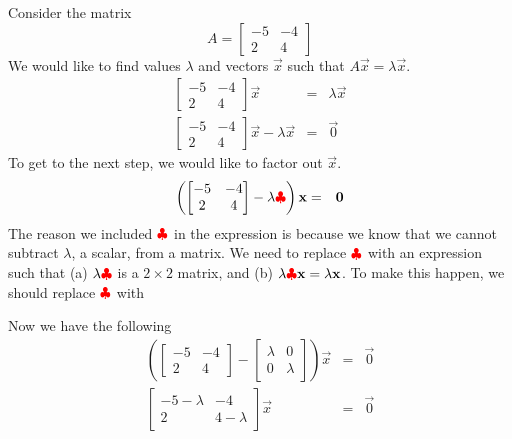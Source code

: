 \documentclass{ximera}
\begin{document}
\begin{exploration}\label{exp:eigenvaluesFind}
Consider the matrix
$$A=\begin{bmatrix}-5& -4\\2&4\end{bmatrix}$$
We would like to find values $\lambda$ and vectors $\vec{x}$ such that $A\vec{x}=\lambda\vec{x}$.
\begin{eqnarray*}
\begin{bmatrix}-5& -4\\2&4\end{bmatrix}\vec{x} &=& \lambda\vec{x}\\
\begin{bmatrix}-5& -4\\2&4\end{bmatrix}\vec{x} - \lambda\vec{x}&=&\vec{0}
\end{eqnarray*}
To get to the next step, we would like to factor out $\vec{x}$.  
\begin{eqnarray*}
    \left(\begin{bmatrix}-5& -4\\2&4\end{bmatrix} - \lambda {\color{red}\clubsuit}\right)\vec{x}&=&\vec{0}
\end{eqnarray*}
The reason we included ${\color{red}\clubsuit}$ in the expression is because we know that we cannot subtract $\lambda$, a scalar, from a matrix.  We need to replace ${\color{red}\clubsuit}$ with an expression such that (a) $\lambda {\color{red}\clubsuit}$ is a $2\times 2$ matrix, and (b) $\lambda {\color{red}\clubsuit}\vec{x}=\lambda\vec{x}$. To make this happen, we should replace ${\color{red}\clubsuit}$ with 

Now we have the following
\begin{eqnarray*}
    \left(\begin{bmatrix}-5& -4\\2&4\end{bmatrix} - \begin{bmatrix}\lambda & 0\\0 & \lambda\end{bmatrix}\right)\vec{x}&=&\vec{0}\\
    \begin{bmatrix}-5-\lambda & -4\\2&4-\lambda\end{bmatrix}\vec{x}&=&\vec{0}
\end{eqnarray*}


\end{exploration}
\end{document}
